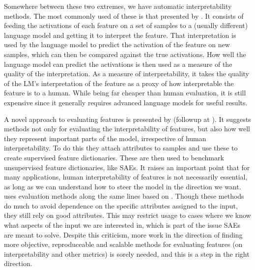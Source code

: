 Somewhere between these two extremes, we have automatic interpretability methods.
The most commonly used of these is that presented by \textcite{bills_language_2023}.
It consists of feeding the activations of each feature on a set of samples to a (usually different) language model and getting it to interpret the feature.
That interpretation is used by the language model to predict the activation of the feature on new samples, which can then be compared against the true activations.
How well the language model can predict the activations is then used as a measure of the quality of the interpretation.
As a measure of interpretability, it takes the quality of the LM's interpretation of the feature as a proxy of how interpretable the feature is to a human.
While being far cheaper than human evaluation, it is still expensive since it generally requires advanced language models for useful results.

A novel approach to evaluating features is presented by \textcite{makelov_towards_2024} (followup at \textcite{makelov_saes_2024}).
It suggests methods not only for evaluating the interpretability of features, but also how well they represent important parts of the model, irrespective of human interpretability.
To do this they attach attributes to samples and use these to create supervised feature dictionaries.
These are then used to benchmark unsupervised feature dictionaries, like SAEs.
It raises an important point that for many applications, human interpretability of features is not necessarily essential, as long as we can understand how to steer the model in the direction we want.
\textcite{huben_research_2024} uses evaluation methods along the same lines based on \textcite{li_emergent_2023}.
Though these methods do much to avoid dependence on the specific attributes assigned to the input, they still rely on good attributes.
This may restrict usage to cases where we know what aspects of the input we are interested in, which is part of the issue SAEs are meant to solve.
Despite this criticism, more work in the direction of finding more objective, reproduceable and scalable methods for evaluating features (on interpretability and other metrics) is sorely needed, and this is a step in the right direction.




